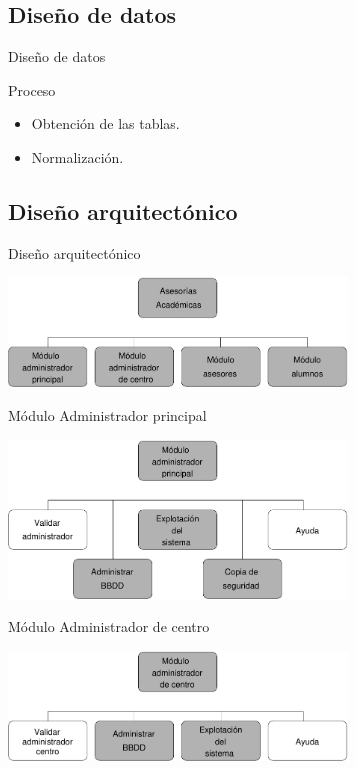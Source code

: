 \documentclass[10pt, hyperref={pdfpagelabels=false}]{beamer}
\begin{document}
    \subsection{Diseño de datos}
      \begin{frame}{Diseño de datos}
        \begin{block}{Proceso}
          \begin{itemize}
            \item Obtención de las tablas.
            \item Normalización.
          \end{itemize}
        \end{block}
        
      \end{frame}

    \subsection{Diseño arquitectónico}
      \begin{frame}{Diseño arquitectónico}
        \begin{center}
          \includegraphics[width=9cm]{Diagramas/disenyoArquitectonico}
        \end{center}
      \end{frame}

      \begin{frame}{Módulo Administrador principal}
        \begin{center}
          \includegraphics[width=9cm]{Diagramas/moduloAdminPrincipal}
        \end{center}
      \end{frame}

      \begin{frame}{Módulo Administrador de centro}
        \begin{center}
          \includegraphics[width=9cm]{Diagramas/moduloAdminCentro}
        \end{center}
      \end{frame}
\end{document}
